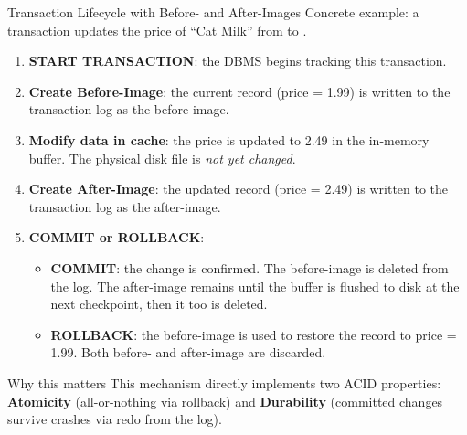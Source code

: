 \begin{frame}{Transaction Lifecycle with Before- and After-Images}
  Concrete example: a transaction updates the price of ``Cat Milk'' from  to .

  \medskip
  \begin{enumerate}
    \item \textbf{START TRANSACTION}: the DBMS begins tracking this transaction.
    \item \textbf{Create Before-Image}: the current record (price = 1.99) is written to the
          transaction log as the before-image.
    \item \textbf{Modify data in cache}: the price is updated to 2.49 in the in-memory buffer.
          The physical disk file is \emph{not yet changed}.
    \item \textbf{Create After-Image}: the updated record (price = 2.49) is written to the
          transaction log as the after-image.
    \item \textbf{COMMIT or ROLLBACK}:
      \begin{itemize}
        \item \textbf{COMMIT}: the change is confirmed. The before-image is deleted from the log.
              The after-image remains until the buffer is flushed to disk at the next checkpoint,
              then it too is deleted.
        \item \textbf{ROLLBACK}: the before-image is used to restore the record to price = 1.99.
              Both before- and after-image are discarded.
      \end{itemize}
  \end{enumerate}

  \medskip
  \begin{block}{Why this matters}
    This mechanism directly implements two ACID properties: \textbf{Atomicity} (all-or-nothing via
    rollback) and \textbf{Durability} (committed changes survive crashes via redo from the log).
  \end{block}
\end{frame}

